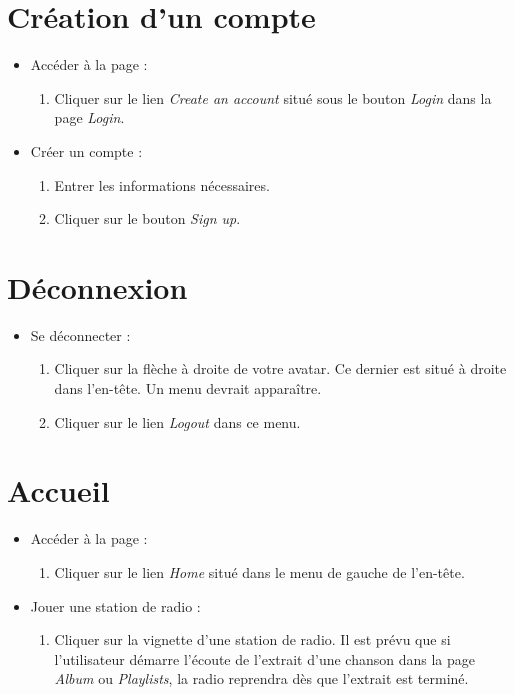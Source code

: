 \documentclass[12pt, letterpaper]{article}
\begin{document}
    \section*{Création d'un compte}
    \begin{itemize}
        \item Accéder à la page :
        \begin{enumerate}
            \item Cliquer sur le lien \textit{Create an account} situé sous le bouton \textit{Login} dans la page \textit{Login}.
        \end{enumerate}

        \item Créer un compte :
        \begin{enumerate}
            \item Entrer les informations nécessaires.
            \item Cliquer sur le bouton \textit{Sign up}.
        \end{enumerate}
    \end{itemize}

    \section*{Déconnexion}
    \begin{itemize}
    \item Se déconnecter :
        \begin{enumerate}
            \item Cliquer sur la flèche à droite de votre avatar. Ce dernier est situé à droite dans l'en-tête. Un menu devrait apparaître.
            \item Cliquer sur le lien \textit{Logout} dans ce menu.
        \end{enumerate}
    \end{itemize}

    \section*{Accueil}
    \begin{itemize}
        \item Accéder à la page :
        \begin{enumerate}
            \item Cliquer sur le lien \textit{Home} situé dans le menu de gauche de l'en-tête.
        \end{enumerate}

        \item Jouer une station de radio :
        \begin{enumerate}
            \item Cliquer sur la vignette d'une station de radio. Il est prévu que si l'utilisateur démarre l'écoute de l'extrait d'une chanson dans la page \textit{Album} ou \textit{Playlists}, la radio reprendra dès que l'extrait est terminé.
        \end{enumerate}
    \end{itemize}
    
\end{document}
